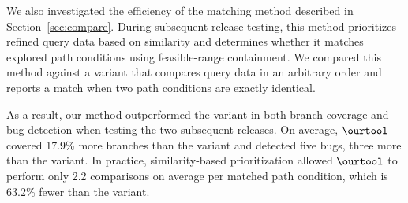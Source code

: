 We also investigated the efficiency of the matching method described in Section~\ref{sec:compare}. During subsequent-release testing, this method prioritizes refined query data based on similarity and determines whether it matches explored path conditions using feasible-range containment. We compared this method against a variant that compares query data in an arbitrary order and reports a match when two path conditions are exactly identical.

As a result, our method outperformed the variant in both branch coverage and bug detection when testing the two subsequent releases. On average, $\ourtool$ covered 17.9\% more branches than the variant and detected five bugs, three more than the variant. In practice, similarity-based prioritization allowed $\ourtool$ to perform only 2.2 comparisons on average per matched path condition, which is 63.2\% fewer than the variant.


